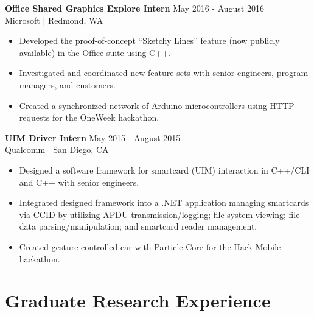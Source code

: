 \documentclass[line]{res}
\begin{document}
\begin{resume}
\vspace{-2mm}

\textbf{Office Shared Graphics Explore Intern} \hfill May 2016 - August 2016
\\
Microsoft | Redmond, WA
\\
\vspace{-3mm}
\begin{itemize}
\item Developed the proof-of-concept ``Sketchy Lines'' feature (now publicly available) in the Office suite using C++.
\item Investigated and coordinated new feature sets with senior engineers, program managers, and customers.
\item Created a synchronized network of Arduino microcontrollers using HTTP requests for the OneWeek hackathon.
\end{itemize}

\vspace{-2mm}

\textbf{UIM Driver Intern} \hfill May 2015 - August 2015
\\
Qualcomm | San Diego, CA
\\
\vspace{-3mm}
\begin{itemize}
\item Designed a software framework for smartcard (UIM) interaction in C++/CLI and C++ with senior engineers.
\item Integrated designed framework into a .NET application managing smartcards via CCID by utilizing APDU transmission/logging; file system viewing; file data parsing/manipulation; and smartcard reader management.
\item Created gesture controlled car with Particle Core for the Hack-Mobile hackathon.
\end{itemize}

\section{\Large{Graduate Research Experience}}
\label{sec:gradexp}
\vspace{2mm}


\end{resume}
\end{document}
